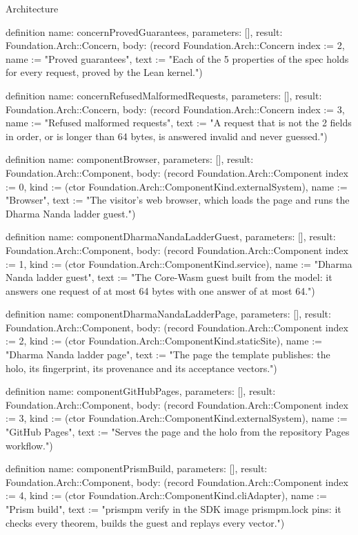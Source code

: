 \begin{lexlean}{Architecture}
\begin{semanticmodule}
definition{
  name: concernProvedGuarantees,
  parameters: [],
  result: Foundation.Arch::Concern,
  body: (record Foundation.Arch::Concern {index := 2, name := "Proved guarantees", text := "Each of the 5 properties of the spec holds for every request, proved by the Lean kernel."})
}

definition{
  name: concernRefusedMalformedRequests,
  parameters: [],
  result: Foundation.Arch::Concern,
  body: (record Foundation.Arch::Concern {index := 3, name := "Refused malformed requests", text := "A request that is not the 2 fields in order, or is longer than 64 bytes, is answered invalid and never guessed."})
}

definition{
  name: componentBrowser,
  parameters: [],
  result: Foundation.Arch::Component,
  body: (record Foundation.Arch::Component {index := 0, kind := (ctor Foundation.Arch::ComponentKind.externalSystem), name := "Browser", text := "The visitor's web browser, which loads the page and runs the Dharma Nanda ladder guest."})
}

definition{
  name: componentDharmaNandaLadderGuest,
  parameters: [],
  result: Foundation.Arch::Component,
  body: (record Foundation.Arch::Component {index := 1, kind := (ctor Foundation.Arch::ComponentKind.service), name := "Dharma Nanda ladder guest", text := "The Core-Wasm guest built from the model: it answers one request of at most 64 bytes with one answer of at most 64."})
}

definition{
  name: componentDharmaNandaLadderPage,
  parameters: [],
  result: Foundation.Arch::Component,
  body: (record Foundation.Arch::Component {index := 2, kind := (ctor Foundation.Arch::ComponentKind.staticSite), name := "Dharma Nanda ladder page", text := "The page the template publishes: the holo, its fingerprint, its provenance and its acceptance vectors."})
}

definition{
  name: componentGitHubPages,
  parameters: [],
  result: Foundation.Arch::Component,
  body: (record Foundation.Arch::Component {index := 3, kind := (ctor Foundation.Arch::ComponentKind.externalSystem), name := "GitHub Pages", text := "Serves the page and the holo from the repository Pages workflow."})
}

definition{
  name: componentPrismBuild,
  parameters: [],
  result: Foundation.Arch::Component,
  body: (record Foundation.Arch::Component {index := 4, kind := (ctor Foundation.Arch::ComponentKind.cliAdapter), name := "Prism build", text := "prismpm verify in the SDK image prismpm.lock pins: it checks every theorem, builds the guest and replays every vector."})
}


\end{semanticmodule}
\end{lexlean}
